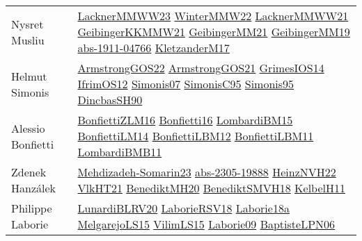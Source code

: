 {\begin{longtable}{p{4cm}p{20cm}}
Nysret Musliu & \href{articles/LacknerMMWW23.pdf}{LacknerMMWW23}\cite{LacknerMMWW23} \href{papers/WinterMMW22.pdf}{WinterMMW22}\cite{WinterMMW22} \href{papers/LacknerMMWW21.pdf}{LacknerMMWW21}\cite{LacknerMMWW21} \href{papers/GeibingerKKMMW21.pdf}{GeibingerKKMMW21}\cite{GeibingerKKMMW21} \href{papers/GeibingerMM21.pdf}{GeibingerMM21}\cite{GeibingerMM21} \href{papers/GeibingerMM19.pdf}{GeibingerMM19}\cite{GeibingerMM19} \href{articles/abs-1911-04766.pdf}{abs-1911-04766}\cite{abs-1911-04766} \href{papers/KletzanderM17.pdf}{KletzanderM17}\cite{KletzanderM17} \\
Helmut Simonis & \href{papers/ArmstrongGOS22.pdf}{ArmstrongGOS22}\cite{ArmstrongGOS22} \href{papers/ArmstrongGOS21.pdf}{ArmstrongGOS21}\cite{ArmstrongGOS21} \href{articles/GrimesIOS14.pdf}{GrimesIOS14}\cite{GrimesIOS14} \href{papers/IfrimOS12.pdf}{IfrimOS12}\cite{IfrimOS12} \href{articles/Simonis07.pdf}{Simonis07}\cite{Simonis07} \href{papers/SimonisC95.pdf}{SimonisC95}\cite{SimonisC95} \href{papers/Simonis95.pdf}{Simonis95}\cite{Simonis95} \href{articles/DincbasSH90.pdf}{DincbasSH90}\cite{DincbasSH90} \\
Alessio Bonfietti & \href{papers/BonfiettiZLM16.pdf}{BonfiettiZLM16}\cite{BonfiettiZLM16} \href{articles/Bonfietti16.pdf}{Bonfietti16}\cite{Bonfietti16} \href{papers/LombardiBM15.pdf}{LombardiBM15}\cite{LombardiBM15} \href{papers/BonfiettiLM14.pdf}{BonfiettiLM14}\cite{BonfiettiLM14} \href{papers/BonfiettiLBM12.pdf}{BonfiettiLBM12}\cite{BonfiettiLBM12} \href{papers/BonfiettiLBM11.pdf}{BonfiettiLBM11}\cite{BonfiettiLBM11} \href{papers/LombardiBMB11.pdf}{LombardiBMB11}\cite{LombardiBMB11} \\
Zdenek Hanz{\'{a}}lek & \href{papers/Mehdizadeh-Somarin23.pdf}{Mehdizadeh-Somarin23}\cite{Mehdizadeh-Somarin23} \href{articles/abs-2305-19888.pdf}{abs-2305-19888}\cite{abs-2305-19888} \href{articles/HeinzNVH22.pdf}{HeinzNVH22}\cite{HeinzNVH22} \href{articles/VlkHT21.pdf}{VlkHT21}\cite{VlkHT21} \href{articles/BenediktMH20.pdf}{BenediktMH20}\cite{BenediktMH20} \href{papers/BenediktSMVH18.pdf}{BenediktSMVH18}\cite{BenediktSMVH18} \href{articles/KelbelH11.pdf}{KelbelH11}\cite{KelbelH11} \\
Philippe Laborie & \href{articles/LunardiBLRV20.pdf}{LunardiBLRV20}\cite{LunardiBLRV20} \href{articles/LaborieRSV18.pdf}{LaborieRSV18}\cite{LaborieRSV18} \href{papers/Laborie18a.pdf}{Laborie18a}\cite{Laborie18a} \href{papers/MelgarejoLS15.pdf}{MelgarejoLS15}\cite{MelgarejoLS15} \href{papers/VilimLS15.pdf}{VilimLS15}\cite{VilimLS15} \href{papers/Laborie09.pdf}{Laborie09}\cite{Laborie09} \href{}{BaptisteLPN06}\cite{BaptisteLPN06} \\

\end{longtable}}
